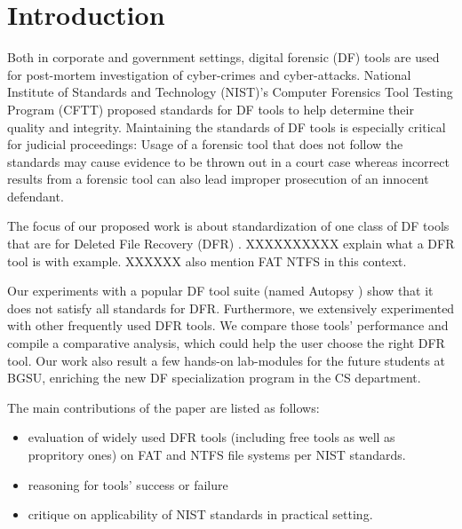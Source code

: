 
\section{Introduction}

Both in corporate and government settings, digital forensic (DF) tools are used for post-mortem investigation of cyber-crimes and cyber-attacks. 
National Institute of Standards and Technology (NIST)'s Computer Forensics Tool Testing Program (CFTT) \cite{cftt:nist} 
proposed standards for DF tools to help determine their quality and integrity. Maintaining the standards of DF tools 
is especially critical for judicial proceedings: Usage of a forensic tool that does not follow the standards may cause evidence to be thrown 
out in a court case whereas incorrect results from a forensic tool can also lead improper prosecution of an innocent defendant. 

The focus of our proposed work is about standardization of one class of DF 
tools that are for Deleted File Recovery (DFR) \cite{meta:dfr:standards}. XXXXXXXXXX explain what a DFR tool is with example. 
XXXXXX also mention FAT NTFS in this context.
 
Our experiments with a popular DF tool suite (named Autopsy \cite{autopsy}) 
show that it does not satisfy all standards for DFR. 
Furthermore, we extensively experimented with other frequently used DFR tools. 
We compare those tools' performance and compile a comparative analysis, which could help the user choose the right DFR tool. 
Our work also result a few hands-on lab-modules for the future students at BGSU, enriching the new DF specialization program in the CS department.

The main contributions of the paper are listed as follows:
\begin{itemize}
\item evaluation of widely used DFR tools (including free tools as well as propritory ones) on FAT and NTFS file systems per NIST standards.
\item reasoning for tools' success or failure
\item critique on applicability of NIST standards in practical setting. 
\end{itemize}
